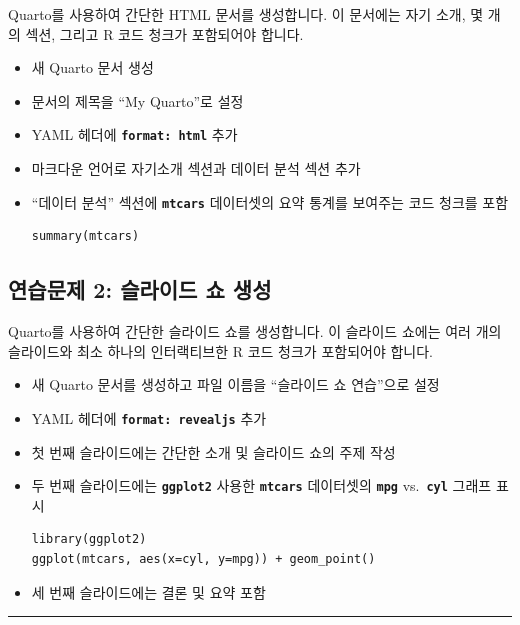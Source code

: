 \documentclass[
  a4paper,
]{book}
\begin{document}
Quarto를 사용하여 간단한 HTML 문서를 생성합니다. 이 문서에는 자기 소개,
몇 개의 섹션, 그리고 R 코드 청크가 포함되어야 합니다.

\begin{itemize}
\item
  새 Quarto 문서 생성
\item
  문서의 제목을 ``My Quarto''로 설정
\item
  YAML 헤더에 \textbf{\texttt{format:\ html}} 추가
\item
  마크다운 언어로 자기소개 섹션과 데이터 분석 섹션 추가
\item
  ``데이터 분석'' 섹션에 \textbf{\texttt{mtcars}} 데이터셋의 요약 통계를
  보여주는 코드 청크를 포함

\begin{verbatim}
summary(mtcars)
\end{verbatim}
\end{itemize}

\hypertarget{uxc5f0uxc2b5uxbb38uxc81c-2-uxc2acuxb77cuxc774uxb4dc-uxc1fc-uxc0dduxc131}{%
\subsection{연습문제 2: 슬라이드 쇼
생성}\label{uxc5f0uxc2b5uxbb38uxc81c-2-uxc2acuxb77cuxc774uxb4dc-uxc1fc-uxc0dduxc131}}

Quarto를 사용하여 간단한 슬라이드 쇼를 생성합니다. 이 슬라이드 쇼에는
여러 개의 슬라이드와 최소 하나의 인터랙티브한 R 코드 청크가 포함되어야
합니다.

\begin{itemize}
\item
  새 Quarto 문서를 생성하고 파일 이름을 ``슬라이드 쇼 연습''으로 설정
\item
  YAML 헤더에 \textbf{\texttt{format:\ revealjs}} 추가
\item
  첫 번째 슬라이드에는 간단한 소개 및 슬라이드 쇼의 주제 작성
\item
  두 번째 슬라이드에는 \textbf{\texttt{ggplot2}} 사용한
  \textbf{\texttt{mtcars}} 데이터셋의 \textbf{\texttt{mpg}}
  vs.~\textbf{\texttt{cyl}} 그래프 표시

\begin{verbatim}
library(ggplot2)
ggplot(mtcars, aes(x=cyl, y=mpg)) + geom_point()
\end{verbatim}
\item
  세 번째 슬라이드에는 결론 및 요약 포함
\end{itemize}

\begin{center}\rule{0.5\linewidth}{0.5pt}\end{center}
\end{document}
